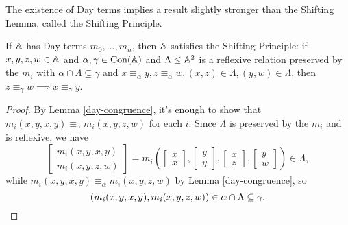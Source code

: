 \begin{appendices}
The existence of Day terms implies a result slightly stronger than the Shifting Lemma, called the Shifting Principle.

\begin{lem} If $\mathbb{A}$ has Day terms $m_0, ..., m_n$, then $\mathbb{A}$ satisfies the Shifting Principle: if $x,y,z,w \in \mathbb{A}$ and $\alpha,\gamma \in \operatorname{Con}(\mathbb{A})$ and $\Lambda \le \mathbb{A}^2$ is a reflexive relation preserved by the $m_i$ with $\alpha \cap \Lambda \subseteq \gamma$ and $x \equiv_\alpha y, z\equiv_\alpha w, (x,z)\in \Lambda, (y,w)\in \Lambda$, then $z \equiv_\gamma w \implies x \equiv_\gamma y$.
\begin{center}
\end{center}
\end{lem}
\begin{proof} By Lemma \ref{day-congruence}, it's enough to show that $m_i(x,y,x,y) \equiv_\gamma m_i(x,y,z,w)$ for each $i$. Since $\Lambda$ is preserved by the $m_i$ and is reflexive, we have
\[
\begin{bmatrix} m_i(x,y,x,y)\\ m_i(x,y,z,w)\end{bmatrix} = m_i\left(\begin{bmatrix} x\\ x\end{bmatrix}, \begin{bmatrix} y\\ y\end{bmatrix}, \begin{bmatrix} x\\ z\end{bmatrix}, \begin{bmatrix} y\\ w\end{bmatrix}\right) \in \Lambda,
\]
while $m_i(x,y,x,y) \equiv_\alpha m_i(x,y,z,w)$ by Lemma \ref{day-congruence}, so
\[
(m_i(x,y,x,y),m_i(x,y,z,w)) \in \alpha \cap \Lambda \subseteq \gamma.\qedhere
\]
\end{proof}


\end{appendices}

